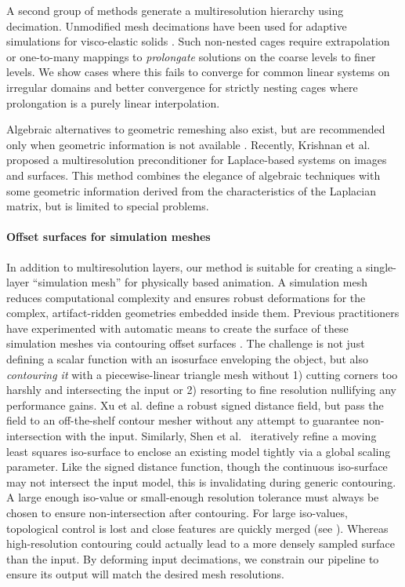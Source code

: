 A second group of methods generate a multiresolution hierarchy using decimation. Unmodified mesh decimations \cite{Garland:1997:SSU} have been used for adaptive
simulations for visco-elastic solids \cite{Debunne:2001:DRD}.
%
Such non-nested cages require extrapolation or one-to-many mappings to
\emph{prolongate} solutions on the coarse levels to finer levels.
%
We show cases where this fails to converge for common linear systems on
irregular domains and better convergence for strictly nesting cages where
prolongation is a purely linear interpolation.

Algebraic alternatives to geometric remeshing also exist,
but are recommended only when geometric information is not available
\cite{falgout06}.
%
Recently, Krishnan et al.  proposed a
multiresolution preconditioner for Laplace-based systems on images and
surfaces.
%
This method combines the elegance of algebraic techniques with some geometric
information derived from the characteristics of the Laplacian matrix, but is
limited to special problems.

\paragraph{Offset surfaces for simulation meshes}
In addition to multiresolution layers, our method is suitable for creating a
single-layer ``simulation mesh'' for physically based animation.
%
A simulation mesh reduces computational complexity and ensures robust
deformations for the complex, artifact-ridden geometries embedded inside them.
%
Previous practitioners have experimented with automatic means to create the
surface of these simulation meshes via contouring offset surfaces
\cite{Campen:2010}.
%
The challenge is not just defining a scalar function with an isosurface
enveloping the object, but also \emph{contouring it} with a piecewise-linear
triangle mesh without 1) cutting corners too harshly and intersecting the input
or 2) resorting to fine resolution nullifying any performance gains.
%
Xu et al.  define a robust signed distance field, but
pass the field to an off-the-shelf contour mesher without any attempt to
guarantee non-intersection with the input.
%
Similarly, Shen et al.\  iteratively refine a moving
least squares iso-surface to enclose an existing model tightly via a global
scaling parameter. Like the signed distance function, though the continuous
iso-surface may not intersect the input model, this is invalidating during
generic contouring.
%
A large enough iso-value or small-enough resolution tolerance must always be
chosen to ensure non-intersection after contouring.
%
For large iso-values, topological control is lost and close features are
quickly merged (see ).
%
Whereas high-resolution contouring could actually lead to a more densely sampled
surface than the input.
%
By deforming input decimations, we constrain our pipeline to ensure its output
will match the desired mesh resolutions. 

